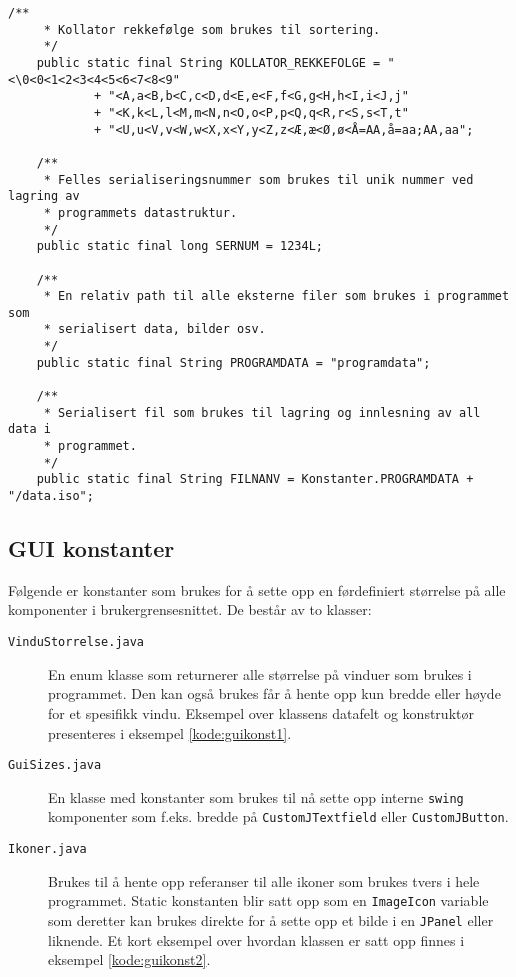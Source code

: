 \begin{lstlisting}[caption=Noen av static kosntanter som brukes i Konstanter klassen., label=kode:konst1]
    /**
     * Kollator rekkefølge som brukes til sortering.
     */
    public static final String KOLLATOR_REKKEFOLGE = "<\0<0<1<2<3<4<5<6<7<8<9"
            + "<A,a<B,b<C,c<D,d<E,e<F,f<G,g<H,h<I,i<J,j"
            + "<K,k<L,l<M,m<N,n<O,o<P,p<Q,q<R,r<S,s<T,t"
            + "<U,u<V,v<W,w<X,x<Y,y<Z,z<Æ,æ<Ø,ø<Å=AA,å=aa;AA,aa";

    /**
     * Felles serialiseringsnummer som brukes til unik nummer ved lagring av
     * programmets datastruktur.
     */
    public static final long SERNUM = 1234L;

    /**
     * En relativ path til alle eksterne filer som brukes i programmet som
     * serialisert data, bilder osv.
     */
    public static final String PROGRAMDATA = "programdata";

    /**
     * Serialisert fil som brukes til lagring og innlesning av all data i
     * programmet.
     */
    public static final String FILNANV = Konstanter.PROGRAMDATA + "/data.iso";
\end{lstlisting}

\subsection{GUI konstanter} \label{subsec:guikonst}
Følgende er konstanter som brukes for å sette opp en førdefiniert størrelse på alle komponenter i brukergrensesnittet. De består av to klasser:
\begin{description}

\item[\texttt{VinduStorrelse.java}]
En enum klasse som returnerer alle størrelse på vinduer som brukes i programmet. Den kan også brukes får å hente opp kun bredde eller høyde for et spesifikk vindu. Eksempel over klassens datafelt og  konstruktør presenteres i eksempel \ref{kode:guikonst1}. 

\item[\texttt{GuiSizes.java}]
En klasse med konstanter som brukes til nå sette opp interne \texttt{swing} komponenter som f.eks. bredde på \texttt{CustomJTextfield} eller \texttt{CustomJButton}.

\item[\texttt{Ikoner.java}]
Brukes til å hente opp referanser til alle ikoner som brukes tvers i hele programmet. Static konstanten blir satt opp som en \texttt{ImageIcon} variable som deretter kan brukes direkte for å sette opp et bilde i en \texttt{JPanel} eller liknende. Et kort eksempel over hvordan klassen er satt opp finnes i eksempel \ref{kode:guikonst2}.
\end{description}

